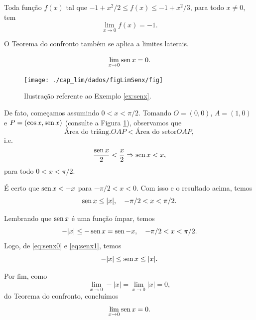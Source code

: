 \begin{ex}
  Toda função $f(x)$ tal que $-1+x^2/2 \leq f(x) \leq -1+x^2/3$, para todo $x\neq 0$, tem
  \begin{equation}
    \lim_{x\to 0} f(x) = -1.
  \end{equation}
\end{ex}

\begin{obs}
  O Teorema do confronto também se aplica a limites laterais.
\end{obs}

\begin{ex}\label{ex:senx}
  \begin{equation}
    \lim_{x\to 0} \operatorname{sen} x = 0.
  \end{equation}

  \begin{figure}[H]
    \centering
    \texttt{[image: ./cap\_lim/dados/figLimSenx/fig]}
    \caption{Ilustração referente ao Exemplo \ref{ex:senx}.}
    \label{fig:limSenx}
  \end{figure}
  
  De fato, começamos assumindo $0<x<\pi/2$. Tomando $O = (0,0)$, $A=(1,0)$ e $P = (\cos x, \operatorname{sen} x)$ (consulte a Figura \ref{fig:limSenx}), observamos que
  \begin{equation}
    \text{Área do triâng.} OAP < \text{Área do setor} OAP,
  \end{equation}
  i.e.
  \begin{equation}
    \frac{\operatorname{sen} x}{2} < \frac{x}{2} \Rightarrow \operatorname{sen} x < x,
  \end{equation}
  para todo $0< x < \pi/2$. 

  É certo que $\operatorname{sen} x < -x$ para $-\pi/2 < x < 0$. Com isso e o resultado acima, temos
  \begin{equation}\label{eq:senx0}
    \operatorname{sen} x \leq |x|,\quad -\pi/2 < x < \pi/2.
  \end{equation}

  Lembrando que $\operatorname{sen} x$ é uma função ímpar, temos
  \begin{equation}\label{eq:senx1}
    -|x| \leq -\operatorname{sen} x = \operatorname{sen} -x,\quad -\pi/2 < x < \pi/2.
  \end{equation}
  Logo, de \eqref{eq:senx0} e \eqref{eq:senx1}, temos
  \begin{equation}
    -|x| \leq \operatorname{sen} x \leq |x|.
  \end{equation}

  Por fim, como
  \begin{equation}
    \lim_{x\to 0} -|x| = \lim_{x\to 0} |x| = 0,
  \end{equation}
  do Teorema do confronto, concluímos
  \begin{equation}
    \lim_{x\to 0} \operatorname{sen} x = 0.
  \end{equation}
\end{ex}

